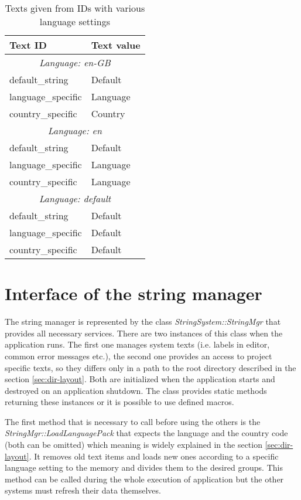 \begin{table}[htbp]
  \begin{center}
	\begin{tabular}{|l|l|}
	\hline
	Text ID & Text value\\
	\hline
	\multicolumn{2}{|c|}{\emph{Language: en-GB}}\\
	\hline
	default\_string & Default\\
	language\_specific & Language\\
	country\_specific & Country\\
	\hline
	\multicolumn{2}{|c|}{\emph{Language: en}}\\
	\hline
	default\_string & Default\\
	language\_specific & Language\\
	country\_specific & Language\\
	\hline
	\multicolumn{2}{|c|}{\emph{Language: default}}\\
	\hline
	default\_string & Default\\
	language\_specific & Default\\
	country\_specific & Default\\
	\hline
	\end{tabular}
	\caption{Texts given from IDs with various language settings}
	\label{tab:dir-layout}
	\end{center}
\end{table}

\section{Interface of the string manager}

The string manager is represented by the class \emph{StringSystem::StringMgr} that provides all necessary services. There are two instances of this class when the application runs. The first one manages system texts (i.e. labels in editor, common error messages etc.), the second one provides an access to project specific texts, so they differs only in a path to the root directory described in the section \ref{sec:dir-layout}. Both are initialized when the application starts and destroyed on an application shutdown. The class provides static methods returning these instances or it is possible to use defined macros.

The first method that is necessary to call before using the others is the \emph{StringMgr::LoadLanguagePack} that expects the language and the country code (both can be omitted) which meaning is widely explained in the section \ref{sec:dir-layout}. It removes old text items and loads new ones according to a specific language setting to the memory and divides them to the desired groups. This method can be called during the whole execution of application but the other systems must refresh their data themselves.

